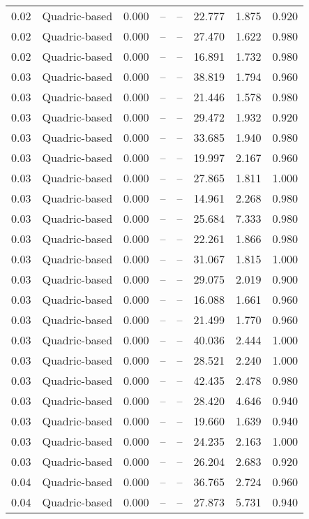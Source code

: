 \begin{table}[H]
\begin{tabular}{l c l l l}
0.02 & Quadric-based & 0.000 & -- & -- & 22.777 & 1.875 & 0.920 \\
0.02 & Quadric-based & 0.000 & -- & -- & 27.470 & 1.622 & 0.980 \\
0.02 & Quadric-based & 0.000 & -- & -- & 16.891 & 1.732 & 0.980 \\
0.03 & Quadric-based & 0.000 & -- & -- & 38.819 & 1.794 & 0.960 \\
0.03 & Quadric-based & 0.000 & -- & -- & 21.446 & 1.578 & 0.980 \\
0.03 & Quadric-based & 0.000 & -- & -- & 29.472 & 1.932 & 0.920 \\
0.03 & Quadric-based & 0.000 & -- & -- & 33.685 & 1.940 & 0.980 \\
0.03 & Quadric-based & 0.000 & -- & -- & 19.997 & 2.167 & 0.960 \\
0.03 & Quadric-based & 0.000 & -- & -- & 27.865 & 1.811 & 1.000 \\
0.03 & Quadric-based & 0.000 & -- & -- & 14.961 & 2.268 & 0.980 \\
0.03 & Quadric-based & 0.000 & -- & -- & 25.684 & 7.333 & 0.980 \\
0.03 & Quadric-based & 0.000 & -- & -- & 22.261 & 1.866 & 0.980 \\
0.03 & Quadric-based & 0.000 & -- & -- & 31.067 & 1.815 & 1.000 \\
0.03 & Quadric-based & 0.000 & -- & -- & 29.075 & 2.019 & 0.900 \\
0.03 & Quadric-based & 0.000 & -- & -- & 16.088 & 1.661 & 0.960 \\
0.03 & Quadric-based & 0.000 & -- & -- & 21.499 & 1.770 & 0.960 \\
0.03 & Quadric-based & 0.000 & -- & -- & 40.036 & 2.444 & 1.000 \\
0.03 & Quadric-based & 0.000 & -- & -- & 28.521 & 2.240 & 1.000 \\
0.03 & Quadric-based & 0.000 & -- & -- & 42.435 & 2.478 & 0.980 \\
0.03 & Quadric-based & 0.000 & -- & -- & 28.420 & 4.646 & 0.940 \\
0.03 & Quadric-based & 0.000 & -- & -- & 19.660 & 1.639 & 0.940 \\
0.03 & Quadric-based & 0.000 & -- & -- & 24.235 & 2.163 & 1.000 \\
0.03 & Quadric-based & 0.000 & -- & -- & 26.204 & 2.683 & 0.920 \\
0.04 & Quadric-based & 0.000 & -- & -- & 36.765 & 2.724 & 0.960 \\
0.04 & Quadric-based & 0.000 & -- & -- & 27.873 & 5.731 & 0.940 \\

\end{tabular}
\end{table}
